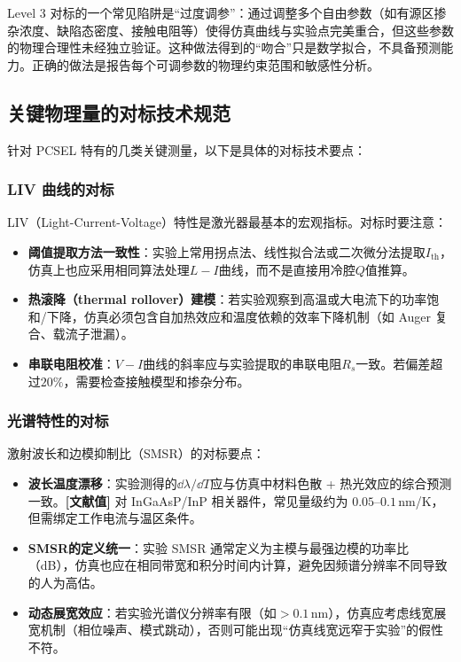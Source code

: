 \begin{WhatCouldGoWrong}
Level 3 对标的一个常见陷阱是“过度调参”：通过调整多个自由参数（如有源区掺杂浓度、缺陷态密度、接触电阻等）使得仿真曲线与实验点完美重合，但这些参数的物理合理性未经独立验证。这种做法得到的“吻合”只是数学拟合，不具备预测能力。正确的做法是报告每个可调参数的物理约束范围和敏感性分析。
\end{WhatCouldGoWrong}

\subsection{关键物理量的对标技术规范}
针对 PCSEL 特有的几类关键测量，以下是具体的对标技术要点：

\subsubsection{LIV 曲线的对标}
LIV（Light-Current-Voltage）特性是激光器最基本的宏观指标。对标时要注意：

\begin{itemize}
  \item \textbf{阈值提取方法一致性}：实验上常用拐点法、线性拟合法或二次微分法提取$I_{\text{th}}$，仿真上也应采用相同算法处理$L-I$曲线，而不是直接用冷腔$Q$值推算。
  
  \item \textbf{热滚降（thermal rollover）建模}：若实验观察到高温或大电流下的功率饱和/下降，仿真必须包含自加热效应和温度依赖的效率下降机制（如 Auger 复合、载流子泄漏）。
  
  \item \textbf{串联电阻校准}：$V-I$曲线的斜率应与实验提取的串联电阻$R_s$一致。若偏差超过$20\%$，需要检查接触模型和掺杂分布。
\end{itemize}

\subsubsection{光谱特性的对标}
激射波长和边模抑制比（SMSR）的对标要点：

\begin{itemize}
  \item \textbf{波长温度漂移}：实验测得的$\dd\lambda/\dd T$应与仿真中材料色散 + 热光效应的综合预测一致。\textbf{[文献值]} 对 InGaAsP/InP 相关器件，常见量级约为 $0.05$--$0.1\,$nm/K，但需绑定工作电流与温区条件\cite{zhang1999doublefusedvcsel}。
  
  \item \textbf{SMSR的定义统一}：实验 SMSR 通常定义为主模与最强边模的功率比（dB），仿真也应在相同带宽和积分时间内计算，避免因频谱分辨率不同导致的人为高估。
  
  \item \textbf{动态展宽效应}：若实验光谱仪分辨率有限（如$>0.1\,$nm），仿真应考虑线宽展宽机制（相位噪声、模式跳动），否则可能出现“仿真线宽远窄于实验”的假性不符。
\end{itemize}

